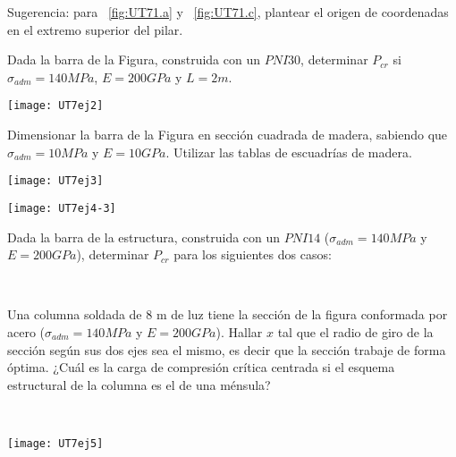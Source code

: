 \begin{figure}[htb]
	\centering
\subfloat[]{
\texttt{[image: UT7ej1-a]}
	\label{fig:UT71.a}}
\hspace{0.1\textwidth}
\subfloat[]{
\texttt{[image: UT7ej1-b]}
	\label{fig:UT71.b}}
	\hspace{0.1\textwidth}
\subfloat[]{
\texttt{[image: UT7ej1-c]}
	\label{fig:UT71.c}}
\caption{}
	\label{fig:UT71}
\end{figure}

Sugerencia: para ~\ref{fig:UT71.a} y ~\ref{fig:UT71.c}, plantear el origen de coordenadas en el extremo superior del pilar.

\ejercicio 

Dada la barra de la Figura, construida con un $PNI30$, determinar $P_{cr}$ si $\sigma_{adm}=140MPa$, $E=200GPa$ y $L=2m$.

\begin{center}
	\texttt{[image: UT7ej2]}
\end{center}

\ejercicio 

Dimensionar la barra de la Figura en sección cuadrada de madera, sabiendo que $\sigma_{adm}=10MPa$ y $E=10GPa$. Utilizar las tablas de escuadrías de madera.

\begin{center}
\texttt{[image: UT7ej3]}
\end{center}

\ejercicio 

\begin{center}
\texttt{[image: UT7ej4-3]}
\end{center}

Dada la barra de la estructura, construida con un $PNI14$ ($\sigma_{adm}=140MPa$ y $E=200GPa$), determinar $P_{cr}$ para los siguientes dos casos:

\begin{figure}[htb]
	\centering
\subfloat[Caso 1]{
\texttt{[image: UT7ej4-1]}
	\label{fig:UT74.1}}
~
\subfloat[Caso 2]{
\texttt{[image: UT7ej4-2]}
	\label{fig:UT74.2}}
\caption{}
	\label{fig:UT74}
\end{figure}

\ejercicio

\begin{minipage}[b]{0.7\textwidth}

Una columna soldada de 8 m de luz tiene la sección de la figura conformada por acero ($\sigma_{adm}=140MPa$ y $E=200GPa$). 
\parte Hallar $x$ tal que el radio de giro de la sección según sus dos ejes sea el mismo, es decir que la sección trabaje de forma óptima.
\parte ¿Cuál es la carga de compresión crítica centrada si el esquema estructural de la columna es el de una ménsula?

\end{minipage}
~
\begin{minipage}[b]{0.3\textwidth}
\begin{center}
\texttt{[image: UT7ej5]}
\end{center}
\end{minipage}

